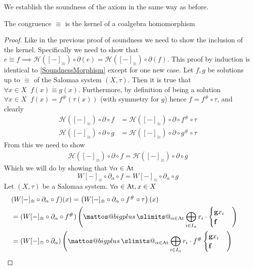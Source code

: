 \documentclass[a4paper,UKenglish,cleveref, autoref, thm-restate]{lipics-v2021}
\makeatletter
\newcommand{\At}{\text{\upshape{At}}}
\theoremstyle{plain}\newtheoremrep{thm}{Theorem}[section]
\newcommand{\bigplus}{\DOTSB\mathop{\mathpalette\mattos@bigplus\relax}\slimits@
}
\newcommand\mattos@bigplus[2]{\vcenter{\hbox{\sbox\z@{$#1\sum$}\resizebox{!}{0.9\dimexpr\ht\z@+\dp\z@}{\raisebox{\depth}{$\m@th#1+$}}}}\vphantom{\sum}}
\makeatother
\begin{document}
	We establish the soundness of the axiom in the same way as before.
	\begin{toappendix}
		\begin{lem}
			The congruence $\dot\equiv$ is the kernel of a coalgebra homomorphism \label{dotKernel}
		\end{lem}
		\begin{proof}
			Like in the previous proof of soundness we need to show the inclusion of the kernel. Specifically we need to show that $e \dot\equiv f \implies \mathcal{H}([-]_{\dot\equiv}) \circ \partial(e) = \mathcal{H}([-]_{\dot\equiv})\circ \partial(f)$. This proof by induction is identical to \cref{SoundnessMorphism} except for one new case.
			Let $f,g$ be solutions up to $\dot\equiv$ of the Salomaa system $(X, \tau)$. Then it is true that $\forall x \in X \;\; f(x) \dot\equiv g(x)$.
			Furthermore, by definition of being a solution $\forall x \in X\;\; f(x) = f^{\#}(\tau(x))$  (with symmetry for $g$) hence $f = f^{\#} \circ \tau$, and clearly
			\begin{align*}
				\mathcal{H}([-]_{\dot\equiv}) \circ \partial \circ f &= \mathcal{H}([-]_{\dot\equiv}) \circ \partial \circ f^{\#} \circ \tau\\
				\mathcal{H}([-]_{\dot\equiv}) \circ \partial \circ g &= \mathcal{H}([-]_{\dot\equiv}) \circ \partial \circ g^{\#} \circ \tau
			\end{align*}
			From this we need to show
			\begin{align*}
				\mathcal{H}([-]_{\dot\equiv}) \circ \partial \circ f = \mathcal{H}([-]_{\dot\equiv}) \circ \partial \circ g
			\end{align*}
			Which we will do by showing that $\forall \alpha \in \At$ $$W[-]_{\dot\equiv} \circ \partial_\alpha \circ f = W[-]_{\dot\equiv} \circ \partial_\alpha \circ g$$
			Let $(X, \tau)$ be a Salomaa system. $\forall \alpha \in \At, x \in X$ 
			\begin{align*}
				&(W[-]_{\dot\equiv} \circ \partial_\alpha \circ f)(x) = \left(W[-]_{\dot\equiv} \circ \partial_\alpha \circ f^\#\circ \tau\right)(x)\\
				&=(W[-]_{\dot\equiv} \circ \partial_\alpha \circ f^\#)\left(\bigplus_{\alpha \in \At}\bigoplus_{i\in I_\alpha} r_i\cdot \begin{cases}\textbf{g}x_{i}\\\textbf{f}\end{cases}\right)&\\
				&=(W[-]_{\dot\equiv} \circ \partial_\alpha)\left(\bigplus_{\alpha \in \At}\bigoplus_{i\in I_\alpha} r_i\cdot f^{\#}\begin{cases}\textbf{g}x_{i}\\\textbf{f}\end{cases}\right)&\\

\end{align*}
\end{proof}
\end{toappendix}
\end{document}
